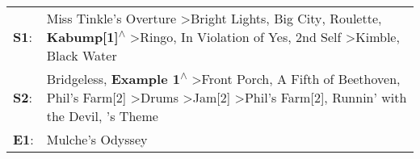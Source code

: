 \begin{supertabular}{p{0.03\textwidth}p{0.92\textwidth}}
 \textbf{S1}:  &                                                     Miss Tinkle's Overture\textsuperscript{} \textgreater \enspace Bright Lights, Big City\textsuperscript{}, \enspace Roulette\textsuperscript{}, \enspace \textbf{Kabump[1]\textsuperscript{$\wedge$}} \textgreater \enspace Ringo\textsuperscript{}, \enspace In Violation of Yes\textsuperscript{}, \enspace 2nd Self\textsuperscript{} \textgreater \enspace Kimble\textsuperscript{}, \enspace Black Water\textsuperscript{}  \enspace  \\
 \textbf{S2}:  &  Bridgeless\textsuperscript{}, \enspace \textbf{Example 1\textsuperscript{$\wedge$}} \textgreater \enspace Front Porch\textsuperscript{}, \enspace A Fifth of Beethoven\textsuperscript{}, \enspace Phil's Farm[2]\textsuperscript{} \textgreater \enspace Drums\textsuperscript{} \textgreater \enspace Jam[2]\textsuperscript{} \textgreater \enspace Phil's Farm[2]\textsuperscript{}, \enspace Runnin' with the Devil\textsuperscript{}, 's Theme\textsuperscript{}  \enspace  \\
 \textbf{E1}:  &                                                                                                                                                                                                                                                                                                                                                                                                                                                 Mulche's Odyssey\textsuperscript{}  \enspace  \\
\end{supertabular}

